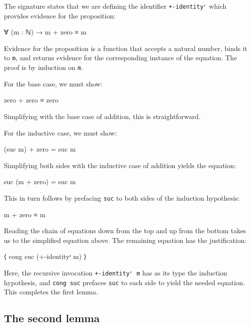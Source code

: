 The signature states that we are defining the identifier
\texttt{+-identityʳ} which provides evidence for the proposition:

\begin{myDisplay}
∀ (m : ℕ) → m + zero ≡ m
\end{myDisplay}

Evidence for the proposition is a function that accepts a natural
number, binds it to \texttt{m}, and returns evidence for the
corresponding instance of the equation. The proof is by induction on
\texttt{m}.

For the base case, we must show:

\begin{myDisplay}
zero + zero ≡ zero
\end{myDisplay}

Simplifying with the base case of addition, this is straightforward.

For the inductive case, we must show:

\begin{myDisplay}
(suc m) + zero = suc m
\end{myDisplay}

Simplifying both sides with the inductive case of addition yields the
equation:

\begin{myDisplay}
suc (m + zero) = suc m
\end{myDisplay}

This in turn follows by prefacing \texttt{suc} to both sides of the
induction hypothesis:

\begin{myDisplay}
m + zero ≡ m
\end{myDisplay}

Reading the chain of equations down from the top and up from the bottom
takes us to the simplified equation above. The remaining equation has
the justification:

\begin{myDisplay}
⟨ cong suc (+-identityʳ m) ⟩
\end{myDisplay}

Here, the recursive invocation \texttt{+-identityʳ\ m} has as its type
the induction hypothesis, and \texttt{cong\ suc} prefaces \texttt{suc}
to each side to yield the needed equation. This completes the first
lemma.

\hypertarget{the-second-lemma}{%
\subsection{The second lemma}\label{the-second-lemma}}

